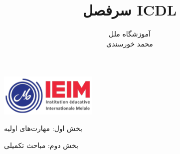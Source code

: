 \documentclass[oneside]{book}
\title{سرفصل ICDL}
\author{
آموزشگاه ملل\\
محمد خورسندی\\
}
\date{}
\begin{document}
\begin{center}
\includegraphics[height=2cm]{logo.png}
\end{center}
\maketitle

\pagebreak
\thispagestyle{empty}
\vspace*{\fill}
\begin{center}
    {\Huge بخش اول: مهارت‌های اولیه}
\end{center}
\vspace*{\fill}
\pagebreak







\pagebreak
\thispagestyle{empty}
\vspace*{\fill}
\begin{center}
    {\Huge بخش دوم: مباحث تکمیلی}
\end{center}
\vspace*{\fill}
\pagebreak


\end{document}
